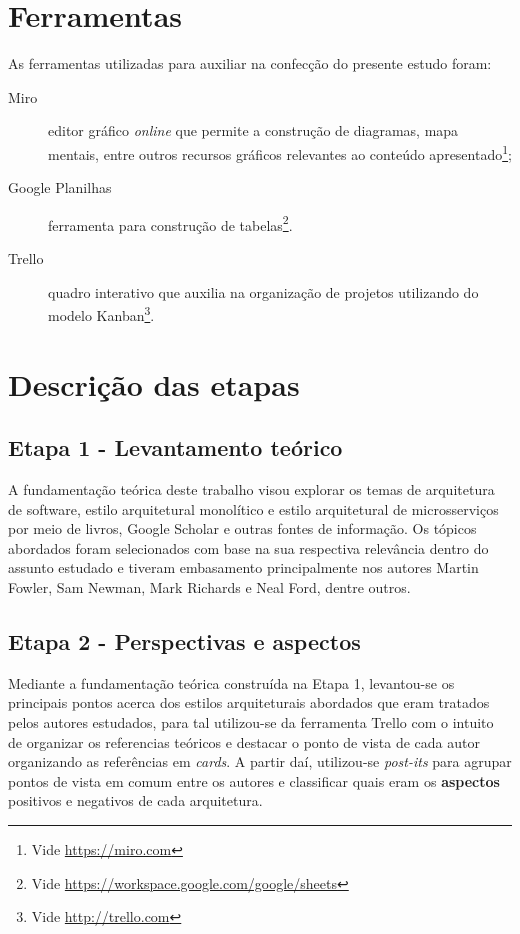 \section{Ferramentas}

As ferramentas utilizadas para auxiliar na confecção do presente estudo foram:

\begin{description}
    \item[Miro] editor gráfico \textit{online} que permite a construção de diagramas, mapa mentais, entre
        outros recursos gráficos relevantes ao conteúdo apresentado\footnote{Vide \url{https://miro.com}};
    \item[Google Planilhas] ferramenta para construção de tabelas\footnote{Vide \url{https://workspace.google.com/google/sheets}}.
    \item[Trello] quadro interativo que auxilia na organização de projetos utilizando do modelo
        Kanban\footnote{Vide \url{http://trello.com}}.
\end{description}

\section{Descrição das etapas}
\subsection{Etapa 1 - Levantamento teórico}

A fundamentação teórica deste trabalho visou explorar os temas de arquitetura de software,
estilo arquitetural monolítico e estilo arquitetural de microsserviços por meio de livros, Google Scholar e
outras fontes de informação. Os tópicos abordados foram selecionados com base na sua respectiva
relevância dentro do assunto estudado e tiveram embasamento principalmente nos autores Martin Fowler,
Sam Newman, Mark Richards e Neal Ford, dentre outros.

\subsection{Etapa 2 - Perspectivas e aspectos}
\label{met:perspectivas}

Mediante a fundamentação teórica construída na Etapa 1, levantou-se os principais pontos acerca dos
estilos arquiteturais abordados que eram tratados pelos autores estudados, para tal utilizou-se da
ferramenta Trello com o intuito de organizar os referencias teóricos e destacar o ponto de vista de
cada autor organizando as referências em \textit{cards}. A partir daí, utilizou-se \textit{post-its}
para agrupar pontos de vista em comum entre os autores e classificar quais eram os \textbf{aspectos}
positivos e negativos de cada arquitetura.

